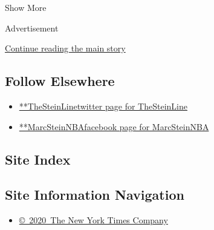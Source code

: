 Show More

Advertisement

\protect\hyperlink{after-mid2}{Continue reading the main story}

\hypertarget{follow-elsewhere}{%
\subsection{Follow Elsewhere}\label{follow-elsewhere}}

\begin{itemize}
\tightlist
\item
  \href{https://twitter.com/TheSteinLine}{**TheSteinLinetwitter page for
  TheSteinLine}
\item
  \href{https://www.facebookcorewwwi.onion/MarcSteinNBA}{**MarcSteinNBAfacebook
  page for MarcSteinNBA}
\end{itemize}

\hypertarget{site-index}{%
\subsection{Site Index}\label{site-index}}

\hypertarget{site-information-navigation}{%
\subsection{Site Information
Navigation}\label{site-information-navigation}}

\begin{itemize}
\tightlist
\item
  \href{https://help.nytimes3xbfgragh.onion/hc/en-us/articles/115014792127-Copyright-notice}{©~2020~The
  New York Times Company}
\end{itemize}

